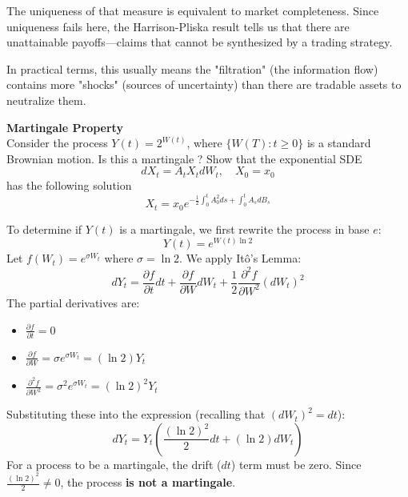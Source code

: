 \documentclass[12pt,a4paper]{exam}
\begin{document}
\begin{questions}
\begin{solution}
\begin{parts}
The uniqueness of that measure is equivalent to market completeness. Since uniqueness fails here, the Harrison-Pliska result tells us that there are unattainable payoffs—claims that cannot be synthesized by a trading strategy.

In practical terms, this usually means the "filtration" (the information flow) contains more "shocks" (sources of uncertainty) than there are tradable assets to neutralize them.

\end{parts}
\end{solution}

\question \textbf{Martingale Property} \\
Consider the process $Y(t) = 2^{W(t)}$, where $\{W(T):t\geq 0\}$ is a standard Brownian motion. Is this a martingale ?
Show that the exponential SDE
\begin{equation*}
	dX_t = A_t X_tdW_t,\quad X_0=x_0
\end{equation*}
has the following solution
\begin{equation*}
	X_t = x_0 e^{-\frac{1}{2}\int_0^t A_0^2 ds+\int_0^t A_s dB_s}
\end{equation*}

\begin{solution}
To determine if $Y(t)$ is a martingale, we first rewrite the process in base $e$:
\begin{equation*}
	Y(t) = e^{W(t) \ln 2}
\end{equation*}
Let $f(W_t) = e^{\sigma W_t}$ where $\sigma = \ln 2$. We apply Itô's Lemma:
\begin{equation*}
dY_t = \frac{\partial f}{\partial t} dt + \frac{\partial f}{\partial W} dW_t + \frac{1}{2} \frac{\partial^2 f}{\partial W^2} (dW_t)^2
\end{equation*}
The partial derivatives are:
\begin{itemize}
	\item $\frac{\partial f}{\partial t} = 0$
	\item $\frac{\partial f}{\partial W} = \sigma e^{\sigma W_t} = (\ln 2) Y_t$
	\item $\frac{\partial^2 f}{\partial W^2} = \sigma^2 e^{\sigma W_t} = (\ln 2)^2 Y_t$
\end{itemize}
Substituting these into the expression (recalling that $(dW_t)^2 = dt$):
\begin{equation*}
	dY_t = Y_t \left( \frac{(\ln 2)^2}{2} dt + (\ln 2) dW_t \right)
\end{equation*}
For a process to be a martingale, the drift ($dt$) term must be zero. Since $\frac{(\ln 2)^2}{2} \neq 0$, the process \textbf{is not a martingale}.


\end{solution}
\end{questions}
\end{document}
